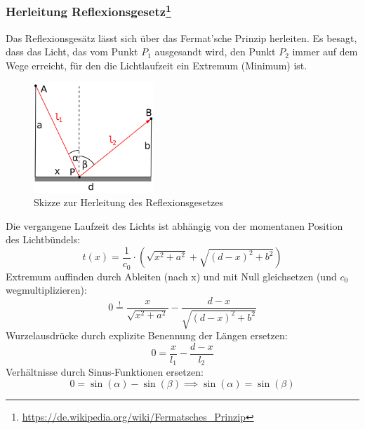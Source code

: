 \documentclass[a4paper, 11pt, ngerman, parskip=half-]{scrartcl}
\begin{document}
\subsubsection*{Herleitung Reflexionsgesetz\footnote{\url{https://de.wikipedia.org/wiki/Fermatsches_Prinzip}}}
Das Reflexionsgesätz lässt sich über das Fermat'sche Prinzip herleiten. Es besagt, dass das Licht, das vom Punkt $P_1$ ausgesandt wird, den Punkt $P_2$ immer auf dem Wege erreicht, für den die Lichtlaufzeit ein Extremum (Minimum) ist.
%
\begin{figure}[H]
    \centering
    \begin{samepage}
        \includegraphics[width=0.4\textwidth]{image/15/reflexionsgesetz.png}
        \caption{Skizze zur Herleitung des Reflexionsgesetzes}
        \label{fig:reflexionsgesetz}
    \end{samepage}
\end{figure}
%
Die vergangene Laufzeit des Lichts ist abhängig von der momentanen Position des Lichtbündels:
\[t(x) = \frac{1}{c_0} \cdot \left( \sqrt{x^2+a^2} + \sqrt{(d-x)^2 + b^2} \right)\]
Extremum auffinden durch Ableiten (nach x) und mit Null gleichsetzen (und $c_0$ wegmultiplizieren):
\[0 \overset{!}{=} \frac{x}{\sqrt{x^2 + a^2}} - \frac{d-x}{\sqrt{(d-x)^2 + b^2}}\]
Wurzelausdrücke durch explizite Benennung der Längen ersetzen:
\[0 = \frac{x}{l_1} - \frac{d-x}{l_2}\]
Verhältnisse durch Sinus-Funktionen ersetzen:
\[0 = \sin(\alpha) - \sin(\beta) \implies \sin(\alpha) = \sin(\beta)\]
\end{document}

